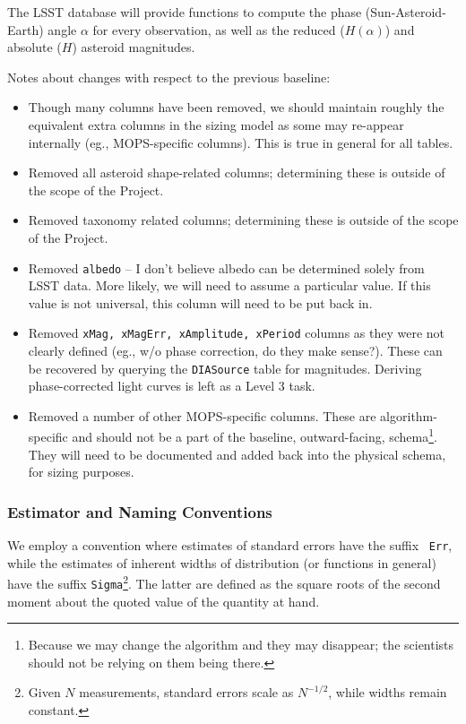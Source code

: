 \documentclass[12pt]{article}
\newcommand{\code}[1]{\texttt{#1}}
\newcommand{\DIASource}{\code{DIASource}\xspace}
\begin{document}
The LSST database will provide functions to compute the phase
(Sun-Asteroid-Earth) angle $\alpha$ for every observation, as well as the
reduced ($H(\alpha)$) and absolute ($H$) asteroid magnitudes.

\begin{changelog}
Notes about changes with respect to the previous baseline:
\begin{itemize}
\item Though many columns have been removed, we should maintain roughly the
      equivalent extra columns in the sizing model as some may re-appear
      internally (eg., MOPS-specific columns). This is true in general for all
      tables.
\item Removed all asteroid shape-related columns; determining these is outside
      of the scope of the Project.
\item Removed taxonomy related columns; determining these is outside of the
      scope of the Project.
\item Removed \texttt{albedo} -- I don't believe albedo can be determined
      solely from LSST data. More likely, we will need to assume a particular
      value. If this value is not universal, this column will need to be put
      back in.
\item Removed \texttt{xMag, xMagErr, xAmplitude, xPeriod} columns as they were
      not clearly defined (eg., w/o phase correction, do they make sense?).
      These can be recovered by querying the \DIASource table for magnitudes.
      Deriving phase-corrected light curves is left as a Level 3 task.
\item Removed a number of other MOPS-specific columns. These are
      algorithm-specific and should not be a part of the baseline,
      outward-facing, schema\footnote{Because we may change the algorithm and
      they may disappear; the scientists should not be relying on them being
      there.}. They will need to be documented and added back into the
      physical schema, for sizing purposes.
\end{itemize}
\end{changelog}

\subsubsection{Estimator and Naming Conventions}

We employ a convention where estimates of standard errors have the suffix {\tt
Err}, while the estimates of inherent widths of distribution (or functions in
general) have the suffix {\tt Sigma}\footnote{Given $N$ measurements, standard
errors scale as $N^{-1/2}$, while widths remain constant.}. The latter are
defined as the square roots of the second moment about the quoted value of the
quantity at hand.
\end{document}
